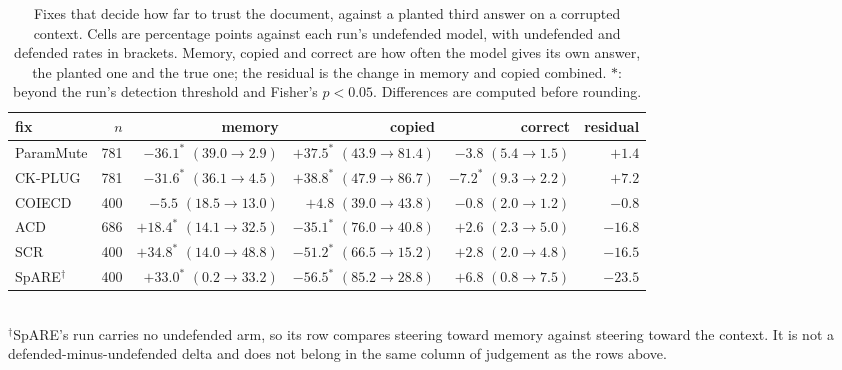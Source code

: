 \begin{table}[t]
\centering
\caption{Fixes that decide how far to trust the document, against a
planted third answer on a corrupted context. Cells are percentage points
against each run's undefended model, with undefended and defended rates in
brackets. Memory, copied and correct are how often the model gives its own
answer, the planted one and the true one; the residual is the
change in memory and copied combined.
$*$: beyond the run's detection threshold and Fisher's $p<0.05$. Differences
are computed before rounding.}
\label{tab:distractor}
\small
\begin{tabular}{@{}lrrrrr@{}}
\toprule
fix & $n$ & memory & copied & correct & residual \\
\midrule
ParamMute &  781 & $-36.1^{*}$ \footnotesize{$(39.0\!\to\!2.9)$} & $+37.5^{*}$ \footnotesize{$(43.9\!\to\!81.4)$} & $-3.8$ \footnotesize{$(5.4\!\to\!1.5)$} & $+1.4$ \\
CK-PLUG   &  781 & $-31.6^{*}$ \footnotesize{$(36.1\!\to\!4.5)$} & $+38.8^{*}$ \footnotesize{$(47.9\!\to\!86.7)$} & $-7.2^{*}$ \footnotesize{$(9.3\!\to\!2.2)$} & $+7.2$ \\
COIECD    &  400 & $-5.5$ \footnotesize{$(18.5\!\to\!13.0)$} & $+4.8$ \footnotesize{$(39.0\!\to\!43.8)$} & $-0.8$ \footnotesize{$(2.0\!\to\!1.2)$} & $-0.8$ \\
ACD       &  686 & $+18.4^{*}$ \footnotesize{$(14.1\!\to\!32.5)$} & $-35.1^{*}$ \footnotesize{$(76.0\!\to\!40.8)$} & $+2.6$ \footnotesize{$(2.3\!\to\!5.0)$} & $-16.8$ \\
SCR       &  400 & $+34.8^{*}$ \footnotesize{$(14.0\!\to\!48.8)$} & $-51.2^{*}$ \footnotesize{$(66.5\!\to\!15.2)$} & $+2.8$ \footnotesize{$(2.0\!\to\!4.8)$} & $-16.5$ \\
\midrule
SpARE$^{\dagger}$ &  400 & $+33.0^{*}$ \footnotesize{$(0.2\!\to\!33.2)$} & $-56.5^{*}$ \footnotesize{$(85.2\!\to\!28.8)$} & $+6.8$ \footnotesize{$(0.8\!\to\!7.5)$} & $-23.5$ \\
\bottomrule
\end{tabular}
\\[2pt]
{\footnotesize $^{\dagger}$SpARE's run carries no undefended arm, so its row
compares steering toward memory against steering toward the context. It is
not a defended-minus-undefended delta and does not belong in the same column
of judgement as the rows above.}
\end{table}
